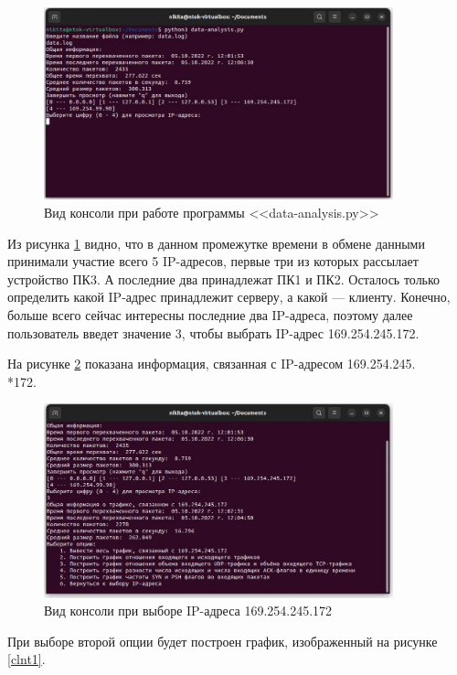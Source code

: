 \documentclass[bachelor, och, coursework]{SCWorks}
\begin{document}
  \begin{figure}[H]
    \centering
    \includegraphics[width=0.9\textwidth]{photo/cmd-start2.jpg}
    \caption{Вид консоли при работе программы <<data-analysis.py>>}
    \label{cmd-strt2}
  \end{figure}

  Из рисунка \ref{cmd-strt2} видно, что в данном промежутке времени в обмене данными принимали участие всего 5 IP-адресов, первые три из которых рассылает
  устройство ПК3. А последние два принадлежат ПК1 и ПК2. Осталось только определить какой IP-адрес принадлежит серверу, а какой --- клиенту. Конечно, больше
  всего сейчас интересны последние два IP-адреса, поэтому далее пользователь введет значение 3, чтобы выбрать IP-адрес 169.254.245.172.

  На рисунке \ref{chmod} показана информация, связанная с IP-адресом 169.254.245.\\*172.

  \begin{figure}[H]
    \centering
    \includegraphics[width=0.9\textwidth]{photo/choose-mode.jpg}
    \caption{Вид консоли при выборе IP-адреса 169.254.245.172}
    \label{chmod}
  \end{figure}

  При выборе второй опции будет построен график, изображенный на рисунке \ref{clnt1}.
\end{document}
